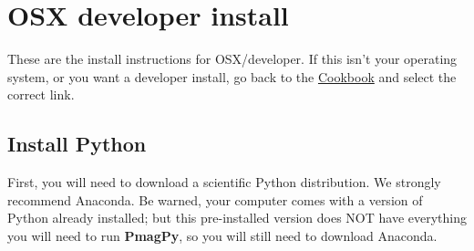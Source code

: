 \documentclass[11pt]{article}
\begin{document}
\tableofcontents

\section{OSX developer install}

These are the install instructions for OSX/developer.  If this isn't your operating system, or you want a developer install, go back to the \href{https://earthref.org/PmagPy/cookbook/#next_steps}{Cookbook} and select the correct link.


\subsection{Install Python}
First, you will need to download a scientific Python distribution.  We strongly recommend Anaconda.  Be warned, your computer comes with a version of Python already installed; but this pre-installed version does NOT have everything you will need to run {\bf PmagPy}, so you will still need to download Anaconda.
\end{document}
